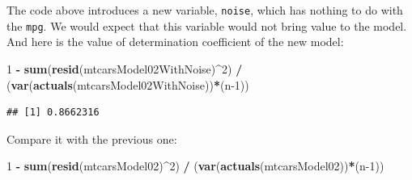 \documentclass[
]{book}
\newenvironment{Shaded}{\begin{snugshade}}{\end{snugshade}}
\newcommand{\CommentTok}[1]{\textcolor[rgb]{0.56,0.35,0.01}{\textit{#1}}}
\newcommand{\DataTypeTok}[1]{\textcolor[rgb]{0.13,0.29,0.53}{#1}}
\newcommand{\DecValTok}[1]{\textcolor[rgb]{0.00,0.00,0.81}{#1}}
\newcommand{\KeywordTok}[1]{\textcolor[rgb]{0.13,0.29,0.53}{\textbf{#1}}}
\newcommand{\NormalTok}[1]{#1}
\newcommand{\OperatorTok}[1]{\textcolor[rgb]{0.81,0.36,0.00}{\textbf{#1}}}
\newcommand{\StringTok}[1]{\textcolor[rgb]{0.31,0.60,0.02}{#1}}
\theoremstyle{definition}
\theoremstyle{definition}
\theoremstyle{definition}
\theoremstyle{definition}
\theoremstyle{remark}
\begin{document}
\begin{Shaded}
\end{Shaded}

The code above introduces a new variable, \texttt{noise}, which has nothing to do with the \texttt{mpg}. We would expect that this variable would not bring value to the model. And here is the value of determination coefficient of the new model:

\begin{Shaded}
\begin{Highlighting}[]
\DecValTok{1} \OperatorTok{{-}}\StringTok{ }\KeywordTok{sum}\NormalTok{(}\KeywordTok{resid}\NormalTok{(mtcarsModel02WithNoise)}\OperatorTok{\^{}}\DecValTok{2}\NormalTok{) }\OperatorTok{/}
\StringTok{    }\NormalTok{(}\KeywordTok{var}\NormalTok{(}\KeywordTok{actuals}\NormalTok{(mtcarsModel02WithNoise))}\OperatorTok{*}\NormalTok{(n}\DecValTok{{-}1}\NormalTok{))}
\end{Highlighting}
\end{Shaded}

\begin{verbatim}
## [1] 0.8662316
\end{verbatim}

Compare it with the previous one:

\begin{Shaded}
\begin{Highlighting}[]
\DecValTok{1} \OperatorTok{{-}}\StringTok{ }\KeywordTok{sum}\NormalTok{(}\KeywordTok{resid}\NormalTok{(mtcarsModel02)}\OperatorTok{\^{}}\DecValTok{2}\NormalTok{) }\OperatorTok{/}
\StringTok{    }\NormalTok{(}\KeywordTok{var}\NormalTok{(}\KeywordTok{actuals}\NormalTok{(mtcarsModel02))}\OperatorTok{*}\NormalTok{(n}\DecValTok{{-}1}\NormalTok{))}
\end{Highlighting}
\end{Shaded}
\end{document}
